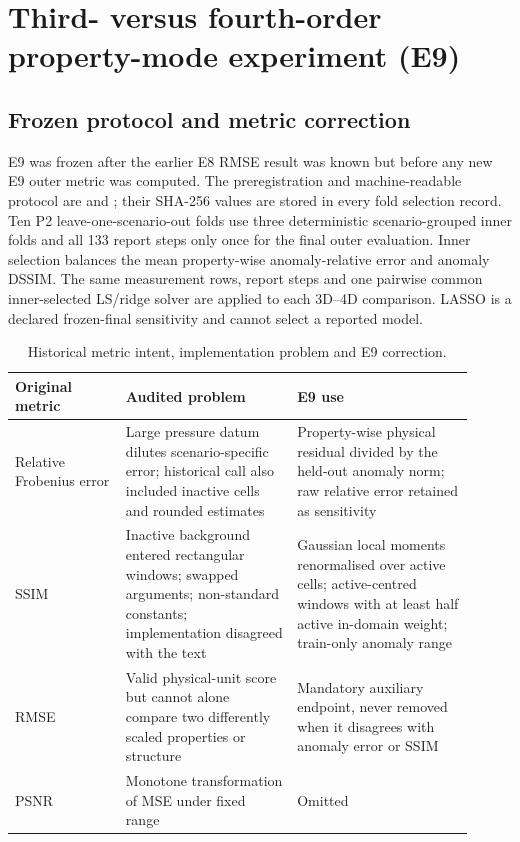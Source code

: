 \section{Third- versus fourth-order property-mode experiment (E9)}
\label{sec:S_e9}

\subsection{Frozen protocol and metric correction}
E9 was frozen after the earlier E8 RMSE result was known but before any new E9 outer metric was computed. The preregistration and machine-readable protocol are  and ; their SHA-256 values are stored in every fold selection record. Ten P2 leave-one-scenario-out folds use three deterministic scenario-grouped inner folds and all 133 report steps only once for the final outer evaluation. Inner selection balances the mean property-wise anomaly-relative error and anomaly DSSIM. The same measurement rows, report steps and one pairwise common inner-selected LS/ridge solver are applied to each 3D--4D comparison. LASSO is a declared frozen-final sensitivity and cannot select a reported model.

\begin{table}[htbp]
\centering
\scriptsize
\caption{Historical metric intent, implementation problem and E9 correction.}
\label{tab:S_e9_metrics}
\begin{tabular}{@{}p{0.22\linewidth}p{0.34\linewidth}p{0.35\linewidth}@{}}
\toprule
Original metric & Audited problem & E9 use \\
\midrule
Relative Frobenius error & Large pressure datum dilutes scenario-specific error; historical call also included inactive cells and rounded estimates & Property-wise physical residual divided by the held-out anomaly norm; raw relative error retained as sensitivity \\
SSIM & Inactive background entered rectangular windows; swapped arguments; non-standard constants; implementation disagreed with the text & Gaussian local moments renormalised over active cells; active-centred windows with at least half active in-domain weight; train-only anomaly range \\
RMSE & Valid physical-unit score but cannot alone compare two differently scaled properties or structure & Mandatory auxiliary endpoint, never removed when it disagrees with anomaly error or SSIM \\
PSNR & Monotone transformation of MSE under fixed range & Omitted \\
\bottomrule
\end{tabular}
\end{table}

